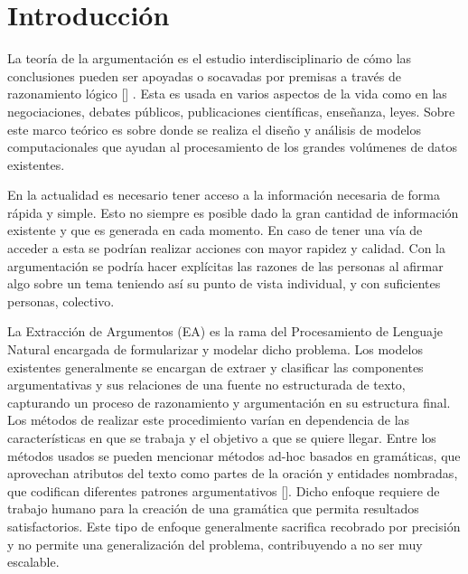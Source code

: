 \chapter*{Introducción}\label{chapter:introduction}


La teoría de la argumentación es el estudio interdisciplinario de cómo las conclusiones
pueden ser apoyadas o socavadas por premisas a través de razonamiento lógico [\cite{wiki-arg-theory}] .
Esta es usada en varios aspectos de la vida como en las negociaciones, debates públicos, publicaciones
científicas, enseñanza, leyes. Sobre este marco teórico es sobre donde se realiza el diseño y análisis de 
modelos computacionales que ayudan al procesamiento de los grandes volúmenes de datos existentes.

En la actualidad es necesario tener acceso a la información necesaria
de forma rápida y simple. Esto no siempre es posible dado la gran cantidad de información existente y
que es generada en cada momento. En caso de tener una vía de acceder a esta se podrían realizar acciones
con mayor rapidez y calidad. Con la argumentación se podría hacer explícitas las razones de las personas 
al afirmar algo sobre un tema teniendo así su punto de vista individual, y con suficientes personas, colectivo.


La Extracción de Argumentos (EA) es la rama del Procesamiento de Lenguaje Natural encargada de formularizar
y modelar dicho problema. Los modelos existentes generalmente se encargan de
extraer y clasificar las componentes argumentativas y sus relaciones de una fuente no estructurada de 
texto, capturando un proceso de razonamiento y argumentación en su estructura final. Los métodos
de realizar este procedimiento varían en dependencia de las características en que se trabaja y el objetivo
a que se quiere llegar. Entre los métodos usados se pueden mencionar métodos ad-hoc basados en gramáticas,
que aprovechan atributos del texto como partes de la oración y entidades nombradas, que codifican diferentes 
patrones argumentativos [\cite{dykes2020reconstructing}]. Dicho enfoque requiere de trabajo 
humano para la creación de una gramática que permita resultados satisfactorios. Este tipo de enfoque
generalmente sacrifica recobrado por precisión y no permite una generalización del problema, contribuyendo
a no ser muy escalable.

